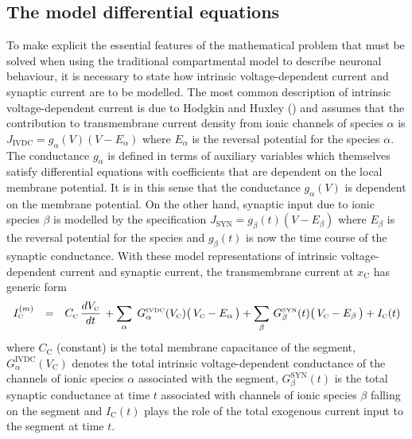 \subsection{The model differential equations}
To make explicit the essential features of the mathematical
problem that must be solved when using the traditional
compartmental model to describe neuronal behaviour, it is
necessary to state how intrinsic voltage-dependent current and
synaptic current are to be modelled. The most common description
of intrinsic voltage-dependent current is due to Hodgkin and
Huxley (\cite{Hodgkin52}) and assumes that the contribution to
transmembrane current density from ionic channels of species
$\alpha$ is $J_\mathrm{IVDC}=g_\alpha(V)(V-E_\alpha)$ where
$E_\alpha$ is the reversal potential for the species $\alpha$. The
conductance $g_\alpha$ is defined in terms of auxiliary variables
which themselves satisfy differential equations with coefficients
that are dependent on the local membrane potential. It is in this
sense that the conductance $g_\alpha(V)$ is dependent on the
membrane potential. On the other hand, synaptic input due to ionic
species $\beta$ is modelled by the specification
$J_\mathrm{SYN}=g_\beta(t)(V-E_\beta)$ where $E_\beta$ is the
reversal potential for the species and $g_\beta(t)$ is now the
time course of the synaptic conductance. With these model
representations of intrinsic voltage-dependent current and
synaptic current, the transmembrane current at $x_\mathrm{C}$ has
generic form
\begin{equation}\label{mde1}
\begin{array}{rcl}
I^{(m)}_{\mbox{\tiny C}} & = & \displaystyle C_{\mbox{\tiny C}}\,
\frac{dV_{\mbox{\tiny C}}}{dt}\,+\sum_\alpha\;
G^{\mbox{\tiny IVDC}}_\alpha(V_{\mbox{\tiny C}})\big(\,V_{\mbox{\tiny C}}-E_\alpha\,\big)
+\sum_\beta\,G^{\mbox{\tiny SYN}}_\beta(t)
\big(\,V_{\mbox{\tiny C}}-E_\beta\,\big)+I_{\mbox{\tiny C}}(t)
\end{array}
\end{equation}
where $C_\mathrm{C}$ (constant) is the total membrane capacitance
of the segment, $G^\mathrm{IVDC}_\alpha(V_\mathrm{C})$ denotes the
total intrinsic voltage-dependent conductance of the channels of
ionic species $\alpha$ associated with the segment,
$G^\mathrm{SYN}_\beta(t)$ is the total synaptic conductance at
time $t$ associated with channels of ionic species $\beta$ falling
on the segment and $I_\mathrm{C}(t)$ plays the role of the total
exogenous current input to the segment at time $t$.

